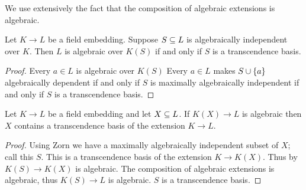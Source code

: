\begin{lem}
    We use extensively the fact that the composition of 
    algebraic extensions is algebraic.
\end{lem}

\begin{prop}
    Let $K \to L$ be a field embedding.
    Suppose $S \subseteq L$ is algebraically independent over $K$.
    Then $L$ is algebraic over $K(S)$ if and only if 
    $S$ is a transcendence basis.
\end{prop}
\begin{proof}
    Every $a \in L$ is algebraic over $K(S)$
    Every $a \in L$ makes $S \cup \left\{a\right\}$ algebraically dependent
    if and only if $S$ is maximally algebraically independent
    if and only if $S$ is a transcendence basis.
\end{proof}

\begin{cor}
    Let $K \to L$ be a field embedding and let $X \subseteq L$.
    If $K(X) \to L$ is algebraic then $X$ contains a transcendence basis
    of the extension $K \to L$.
\end{cor}
\begin{proof}
    Using Zorn we have a maximally algebraically independent subset of $X$;
    call this $S$. 
    This is a transcendence basis of the extension $K \to K(X)$.
    Thus by  
    $K(S) \to K(X)$ is algebraic.
    The composition of algebraic extensions is algebraic,
    thus $K(S) \to L$ is algebraic.
    $S$ is a transcendence basis.
\end{proof}

